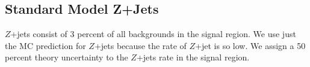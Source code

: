 
\subsection{Standard Model Z+Jets}
\label{sec:Bkg:zjet}

\indent $Z$+jets consist of 3 percent of all backgrounds in the signal region.   We use just the MC prediction for $Z$+jets because the rate of $Z$+jet is so low.  We assign a 50 percent theory uncertainty to the $Z$+jets rate in the signal region.  \\


